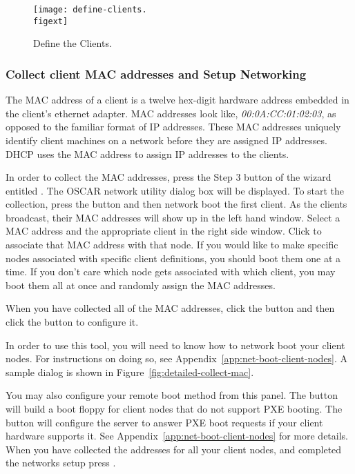 \begin{figure}[htbp]
  \begin{center}
    \texttt{[image: define-clients.\\figext]}
    \caption{Define the Clients.}
    \label{fig:detailed-define-clients}
  \end{center}
\end{figure}
    
\subsubsection{Collect client MAC addresses and Setup Networking} 
\label{det:setupnetwork}

The MAC address of a client
is a twelve hex-digit hardware address embedded in the client's
ethernet adapter. MAC addresses look like, \emph{00:0A:CC:01:02:03}, as
opposed to the familiar format of IP addresses. These MAC addresses
uniquely identify client machines on a network before they are
assigned IP addresses. DHCP uses the MAC address to assign IP 
addresses to the clients.

In order to collect the MAC addresses,  press the Step 3 button
  of the wizard entitled . The
  OSCAR network utility dialog box will be displayed.
  To start the collection, press the  button and then
  network boot the first client.  As the clients broadcast, their MAC addresses
  will show up in the left hand window. Select a MAC address and the appropriate
  client in the right side window. Click  to 
  associate that MAC address with that node. If you would like to make 
  specific nodes associated with specific client definitions, you should
  boot them one at a time. If you don't care which node gets associated
  with which client, you may boot them all at once and randomly assign
  the MAC addresses.

  When you have collected all of the MAC addresses, click the 
  button and then click the  button to configure it.

  In order to use this tool, you will need to know
  how to network boot your client nodes.  For instructions on doing
  so, see Appendix~\ref{app:net-boot-client-nodes}. A sample dialog
  is shown in Figure~\ref{fig:detailed-collect-mac}. 
 
  You may also configure your remote boot method from this panel. The
   button will build a boot floppy for
  client nodes that do not support PXE booting. The  button will configure the server to answer PXE boot requests if
  your client hardware supports it. See Appendix~\ref{app:net-boot-client-nodes}
  for more details.
  When you have collected the
  addresses for all your client nodes, and completed the networks setup
  press .

